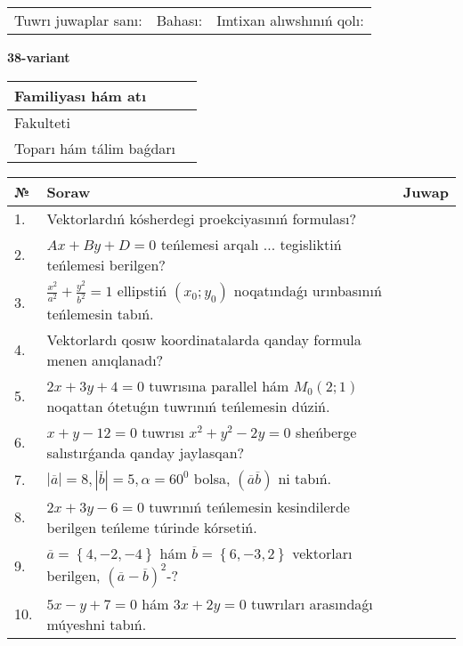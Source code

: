\documentclass{article}
\begin{document}
\vspace{1cm}

\begin{tabular}{lll}
Tuwrı juwaplar sanı: \underline{\hspace{1.5cm}} & 
Bahası: \underline{\hspace{1.5cm}} & 
Imtixan alıwshınıń qolı: \underline{\hspace{2cm}} \\
\end{tabular}

\egroup

\newpage


\textbf{38-variant}\\

\bgroup
\def\arraystretch{1.6} %

\begin{tabular}{|m{5.7cm}|m{9.5cm}|}
\hline
Familiyası hám atı & \\
\hline
Fakulteti  & \\
\hline
Toparı hám tálim baǵdarı  & \\
\hline
\end{tabular}

\vspace{1cm}

\begin{tabular}{|m{0.7cm}|m{10cm}|m{4cm}|}
\hline
№ & Soraw & Juwap \\
\hline
1. & Vektorlardıń kósherdegi proekciyasınıń formulası? &  \\
\hline
2. & $Ax+By+D=0$ teńlemesi arqalı ... tegisliktiń teńlemesi berilgen? &  \\
\hline
3. & $\frac{x^2}{a^2}+\frac{y^2}{b^2}=1$ ellipstiń $(x_0;y_0)$ noqatındaǵı urınbasınıń teńlemesin tabıń. &  \\
\hline
4. & Vektorlardı qosıw koordinatalarda qanday formula menen anıqlanadı? &  \\
\hline
5. & $2x+3y+4=0$ tuwrısına parallel hám $M_{0} (2;1)$ noqattan ótetuǵın tuwrınıń teńlemesin dúziń. &  \\
\hline
6. & $x+y-12=0$ tuwrısı $x^{2}+y^{2}-2y=0$ sheńberge salıstırǵanda qanday jaylasqan? &  \\
\hline
7. & $\left| \overline{a} \right|=8, \left| \overline{b} \right|=5, \alpha=60^{0}$ bolsa, $( \overline{a}\overline{b} )$ ni tabıń. &  \\
\hline
8. & $2x+3y-6=0$ tuwrınıń teńlemesin kesindilerde berilgen teńleme túrinde kórsetiń. &  \\
\hline
9. & $\overline{a}=\left\{ 4,-2,-4 \right\}$ hám $\overline{b}=\left\{ 6,-3, 2 \right\}$ vektorları berilgen, $(\overline{a}-\overline{b}) ^{2}$-? &  \\
\hline
10. & $5x-y+7=0$ hám $3x+2y=0$ tuwrıları arasındaǵı múyeshni tabıń. &  \\
\hline
\end{tabular}
\end{document}
